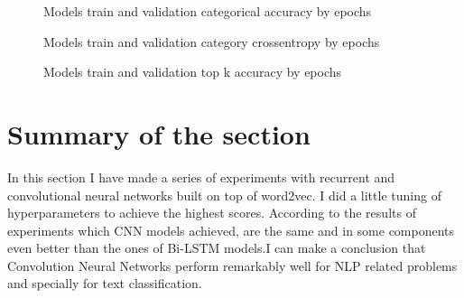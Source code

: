 \begin{figure}[ht]
	\begin{minipage}[ht]{1\linewidth}
	\end{minipage}
	\hfill
	\begin{minipage}[ht]{1\linewidth}
	\end{minipage}
	\caption{Models train and validation categorical accuracy by epochs}
	\label{img:final_CNN_categorical_accuracy}  
\end{figure}


\begin{figure}[ht]
	\begin{minipage}[ht]{1\linewidth}
	\end{minipage}
	\hfill
	\begin{minipage}[ht]{1\linewidth}
	\end{minipage}
	\caption{Models train and validation category crossentropy by epochs}
	\label{img:final_CNN_category_crossentropy}  
\end{figure}

\clearpage
\begin{figure}[ht]
	\begin{minipage}[ht]{1\linewidth}
	\end{minipage}
	\hfill
	\begin{minipage}[ht]{1\linewidth}
	\end{minipage}
	\caption{Models train and validation top k accuracy by epochs}
	\label{img:final_CNN_top_k_accuracy}  
\end{figure}


\section{Summary of the section} \label{sect4_6}

In this section I have made a series of
experiments with recurrent and convolutional neural networks
built on top of word2vec. I did a little tuning
of hyperparameters to achieve the highest scores. 
According to the results of experiments which CNN models achieved, are the same and in some components even better than the ones of Bi-LSTM models.I can make a conclusion that Convolution Neural Networks perform remarkably well for NLP related problems and specially for text classification. 



